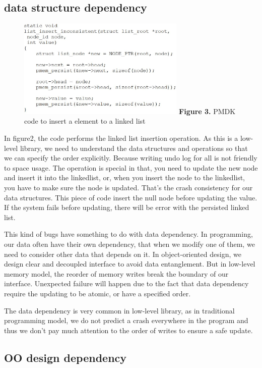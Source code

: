 \documentclass{sig-alternate}
\begin{document}
\subsection{data structure dependency}

\begin{figure}
\includegraphics[width=8cm]{error1}
\textbf{Figure 3.} PMDK code to insert a element to a linked list
\end{figure}

In figure2, the code performs the linked list insertion operation. As this is a low-level library, we need to understand the data structures and operations so that we can specify the order explicitly. Because writing undo log for all is not friendly to space usage. The operation is special in that, you need to update the new node and insert it into the linkedlist, or, when you insert the node to the linkedlist, you have to make sure the node is updated. That's the crash consistency for our data structures. This piece of code insert the null node before updating the value. If the system fails before updating, there will be error with the persisted linked list.

	This kind of bugs have something to do with data dependency. In programming, our data often have their own dependency, that when we modify one of them, we need to consider other data that depends on it. In object-oriented design, we design clear and decoupled interface to avoid data entanglement. But in low-level memory model, the reorder of memory writes break the boundary of our interface. Unexpected failure will happen due to the fact that data dependency require the updating to be atomic, or have a specified order.

	The data dependency is very common in low-level library, as in traditional programming model, we do not predict a crash everywhere in the program and thus we don't pay much attention to the order of writes to ensure a safe update. 

\subsection{OO design dependency}
\end{document}
